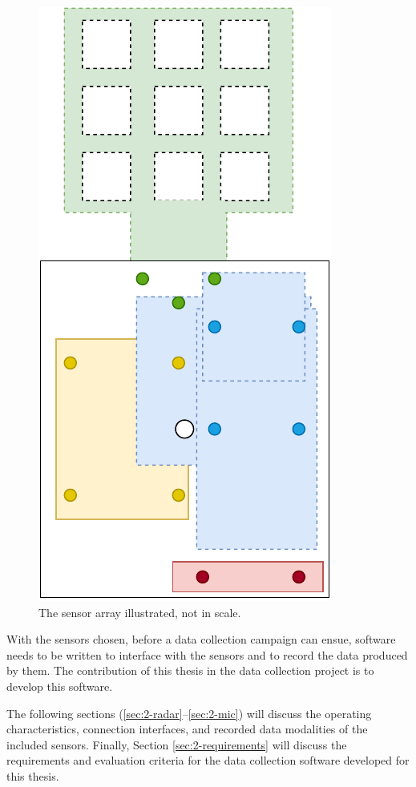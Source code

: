 \begin{figure}[H]
    \centering
    \includegraphics{fig/3/sensor-array.pdf}
    \caption{The sensor array illustrated, not in scale.}
    \label{fig:sensor-array}
\end{figure}

With the sensors chosen,
before a data collection campaign can ensue,
software needs to be written to interface with the sensors and to record the data produced by them.
The contribution of this thesis in the data collection project is to develop this software.

The following sections (\ref{sec:2-radar}--\ref{sec:2-mic}) will discuss the operating characteristics, connection interfaces,
and recorded data modalities of the included sensors.
Finally, Section \ref{sec:2-requirements} will discuss the requirements
and evaluation criteria for the data collection software developed for this thesis.

